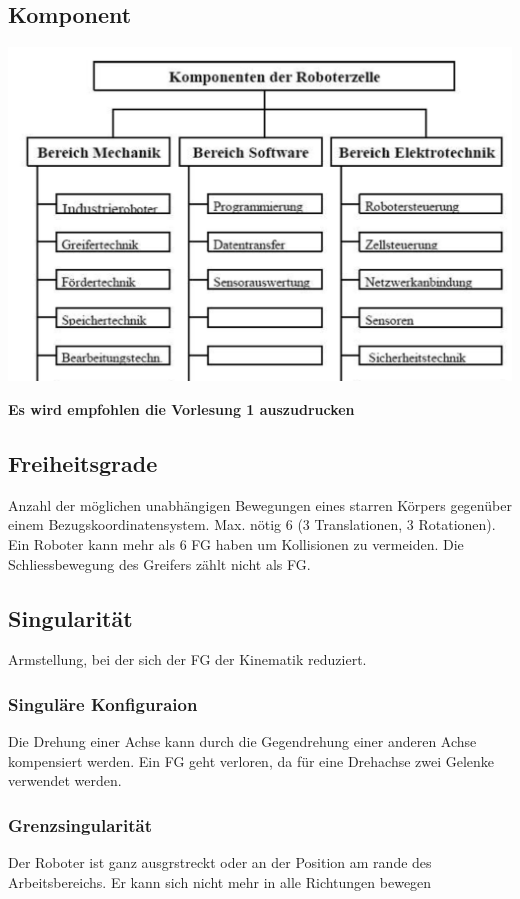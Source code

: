 \begin{minipage}{0.5\linewidth}
    \subsection{Komponent}
    \includegraphics[width=\linewidth]{./bilder/komponent}
    
    \textbf{Es wird empfohlen die Vorlesung 1 auszudrucken}
\end{minipage}
\begin{minipage}{0.5\linewidth}
    \subsection{Freiheitsgrade }
    Anzahl der möglichen unabhängigen Bewegungen eines starren Körpers gegenüber einem Bezugskoordinatensystem. Max. nötig 6 (3 Translationen, 3 Rotationen). Ein Roboter kann mehr als 6 FG haben um Kollisionen zu vermeiden. Die Schliessbewegung des Greifers zählt nicht als FG.
    
    \subsection{Singularität }
    Armstellung, bei der sich der FG der Kinematik reduziert.
    \subsubsection{Singuläre Konfiguraion}
    Die Drehung einer Achse kann durch die Gegendrehung einer anderen Achse kompensiert werden.
    Ein FG geht verloren, da für eine Drehachse zwei Gelenke verwendet werden.
    \subsubsection{Grenzsingularität}
    Der Roboter ist ganz ausgrstreckt oder an der Position am rande des Arbeitsbereichs. Er kann sich nicht mehr in alle Richtungen bewegen
\end{minipage}

